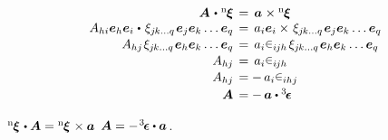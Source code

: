 \nopagebreak\vspace{-0.1em}
\begin{equation*}
\begin{array}{r@{\hspace{1ex}}c@{\hspace{1ex}}l}
\bm{A} \hspace{.2ex}\dotp\hspace{.1ex} {^\mathrm{n}\hspace{-0.12ex}\bm{\xi}} & = & \bm{a} \hspace{.1ex} \times {^\mathrm{n}\hspace{-0.12ex}\bm{\xi}}
\\
%
A_{hi} \bm{e}_h \bm{e}_i \hspace{.1ex}\dotp\hspace{.25ex} \xi_{j\hspace{-0.1ex}k \ldots q} \hspace{.2ex} \bm{e}_j \bm{e}_k \ldots \bm{e}_q & = & a_{i} \bm{e}_i \times\hspace{.2ex} \xi_{j\hspace{-0.1ex}k \ldots q} \hspace{.2ex} \bm{e}_j \bm{e}_k \ldots \bm{e}_q
\\[.1em]
%
A_{hj} \hspace{.2ex} \xi_{j\hspace{-0.1ex}k \ldots q} \hspace{.2ex} \bm{e}_h \bm{e}_k \ldots \bm{e}_q & = & a_{i} \permutationsparitysymbols{i\hspace{-0.1ex}jh} \hspace{.2ex} \xi_{j\hspace{-0.1ex}k \ldots q} \hspace{.2ex} \bm{e}_h \bm{e}_k \ldots \bm{e}_q
\\[.1em]
%
A_{hj} & = & a_{i} \permutationsparitysymbols{i\hspace{-0.1ex}jh}
\\[.1em]
%
A_{hj} & = & \! - \, a_{i} \permutationsparitysymbols{ihj}
\\[.2em]
%
\bm{A} & = & \! - \, \bm{a} \dotp \permutationsparitytensor
\end{array}
\end{equation*}

\vspace{-0.5em}\noindent
{}%
${{^\mathrm{n}\hspace{-0.12ex}\bm{\xi}} \hspace{.2ex} \dotp \bm{A} = {^\mathrm{n}\hspace{-0.12ex}\bm{\xi}} \hspace{.2ex}\times \bm{a}}$
${\bm{A} = - \hspace{.2ex} \permutationsparitytensor \dotp \bm{a}\hspace{.1ex}}$.

